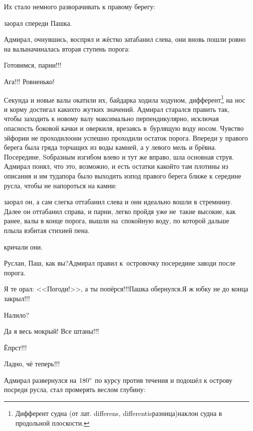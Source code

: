 Их стало немного разворачивать к правому берегу:

\mdash заорал спереди Пашка.

Адмирал, очнувшись, воспрял и жёстко затабанил слева, они вновь пошли ровно на валы\mdash начиналась вторая ступень порога:

\diagdash Готовимся, парни!!!

\diagdash Ага!!! Ровненько!

\renewcommand*{\thefootnote}{\fnsymbol{footnote}}
\setcounter{footnote}{0}
Секунда и новые валы окатили их, байдарка ходила ходуном, дифферент\footnote{Дифферент судна (от лат. differens, differentis\mdash разница)\mdash наклон судна в продольной плоскости\cite{МорскойСправочник}.} на нос и корму достигал каких\sdash то жутких значений. Адмирал старался править так, чтобы заходить к новому валу максимально перпендикулярно, исключая опасность боковой качки и оверкиля, врезаясь в~бурлящую воду носом. Чувство эйфории не проходило\mdash они успешно проходили остаток порога. Впереди у правого берега была гряда торчащих из воды камней, а у левого мель и брёвна. Посередине, S\sdash образным изгибом влево и тут же вправо, шла основная струя. Адмирал понял, что это, возможно, и есть остатки какой\sdash то там плотины из описания и им туда\mdash пора было выходить из\sdash под правого берега ближе к середине русла, чтобы не напороться на камни:

\mdash заорал он, а сам слегка оттабанил слева и они идеально вошли в стремнину. Далее он оттабанил справа, и парни, легко пройдя уже не~такие высокие, как ранее, валы в конце порога, вышли на~спокойную воду, по которой дальше плыла взбитая стихией пена.

\mdash кричали они.

\diagdash Руслан, Паш, как вы?\mdash Адмирал правил к~островочку посередине заводи после порога.

\diagdash Я те орал: <<Погоди!>>, а ты попёрся!!!\mdash Пашка обернулся.\mdash Я ж юбку не до конца закрыл!!!

\diagdash Налило?

\diagdash Да я весь мокрый! Все штаны!!!

\diagdash Ёпрст!!!

\diagdash Ладно, чё теперь!!!

Адмирал развернулся на $180\degree$ по курсу против течения и подошёл к острову посреди русла, стал промерять веслом глубину:


